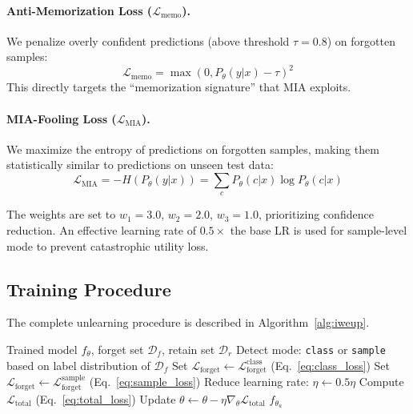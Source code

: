 \documentclass[11pt]{article}
\newcommand{\method}{\textsc{IWEUP v2}}
\newcommand{\Loss}{\mathcal{L}}
\begin{document}
\paragraph{Anti-Memorization Loss ($\Loss_{\text{memo}}$).}
We penalize overly confident predictions (above threshold $\tau = 0.8$) on forgotten samples:
\begin{equation}
    \Loss_{\text{memo}} = \max(0, P_\theta(y|x) - \tau)^2
\end{equation}
This directly targets the ``memorization signature'' that MIA exploits.

\paragraph{MIA-Fooling Loss ($\Loss_{\text{MIA}}$).}
We maximize the entropy of predictions on forgotten samples, making them statistically similar to predictions on unseen test data:
\begin{equation}
    \Loss_{\text{MIA}} = -H\left(P_\theta(y|x)\right) = \sum_c P_\theta(c|x) \log P_\theta(c|x)
\end{equation}

The weights are set to $w_1 = 3.0$, $w_2 = 2.0$, $w_3 = 1.0$, prioritizing confidence reduction. An effective learning rate of $0.5\times$ the base LR is used for sample-level mode to prevent catastrophic utility loss.

\subsection{Training Procedure}
The complete unlearning procedure is described in Algorithm~\ref{alg:iweup}.

\begin{algorithm}[t]
\caption{\method{} Unlearning}
\label{alg:iweup}
\begin{algorithmic}[1]
\REQUIRE Trained model $f_\theta$, forget set $\mathcal{D}_f$, retain set $\mathcal{D}_r$
\STATE Detect mode: \texttt{class} or \texttt{sample} based on label distribution of $\mathcal{D}_f$
    \STATE Set $\Loss_{\text{forget}} \leftarrow \Loss_{\text{forget}}^{\text{class}}$ (Eq.~\ref{eq:class_loss})
\ELSE
    \STATE Set $\Loss_{\text{forget}} \leftarrow \Loss_{\text{forget}}^{\text{sample}}$ (Eq.~\ref{eq:sample_loss})
    \STATE Reduce learning rate: $\eta \leftarrow 0.5 \eta$
\ENDIF
{}
        \STATE Compute $\Loss_{\text{total}}$ (Eq.~\ref{eq:total_loss})
        \STATE Update $\theta \leftarrow \theta - \eta \nabla_\theta \Loss_{\text{total}}$
    \ENDFOR
\ENDFOR
\RETURN $f_{\theta_u}$
\end{algorithmic}
\end{algorithm}
\end{document}
